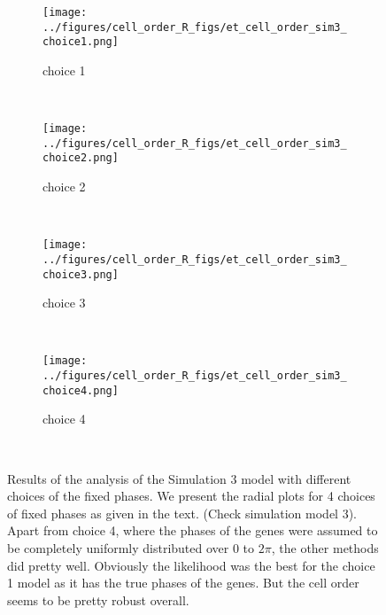 \documentclass[11pt]{article}
\begin{document}
 \begin{figure*}[ht]
    \centering
     \begin{subfigure}[t]{0.5\textwidth}
        \centering
        \texttt{[image: ../figures/cell\_order\_R\_figs/et\_cell\_order\_sim3\_choice1.png]}
        \caption{choice 1}
    \end{subfigure}%
    ~
    \begin{subfigure}[t]{0.5\textwidth}
        \centering
        \texttt{[image: ../figures/cell\_order\_R\_figs/et\_cell\_order\_sim3\_choice2.png]}
        \caption{choice 2}
    \end{subfigure}\\

     \begin{subfigure}[t]{0.5\textwidth}
        \centering
        \texttt{[image: ../figures/cell\_order\_R\_figs/et\_cell\_order\_sim3\_choice3.png]}
        \caption{choice 3}
    \end{subfigure}%
    ~
       \begin{subfigure}[t]{0.5\textwidth}
        \centering
        \texttt{[image: ../figures/cell\_order\_R\_figs/et\_cell\_order\_sim3\_choice4.png]}
        \caption{choice 4}
    \end{subfigure}\\
  \caption{Results of the analysis of the Simulation 3 model with different choices of the fixed phases. We present the radial plots for 4 choices of fixed phases as given in the text. (Check simulation model 3). Apart from choice 4, where the phases of the genes were assumed to be completely uniformly distributed over $0$ to $2 \pi$, the other methods did pretty well. Obviously the likelihood was the best for the choice 1 model as it has the true phases of the genes. But the cell order seems to be pretty robust overall.}
 \label{fig:fig9}
 \end{figure*}
\end{document}
